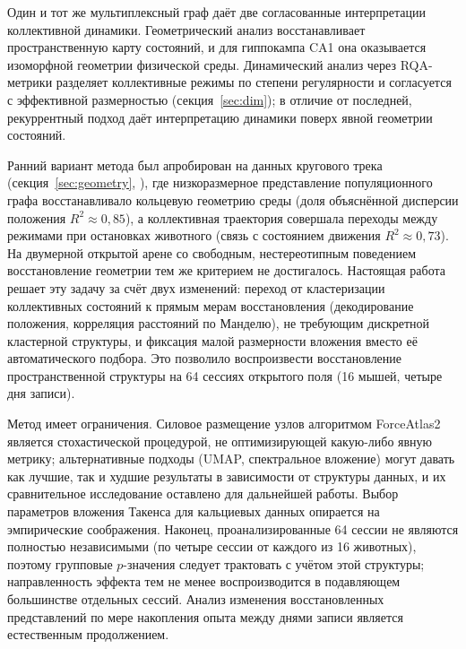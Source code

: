 Один и тот же мультиплексный граф даёт две согласованные интерпретации коллективной динамики. Геометрический анализ восстанавливает пространственную карту состояний, и для гиппокампа CA1 она оказывается изоморфной геометрии физической среды. Динамический анализ через RQA-метрики разделяет коллективные режимы по степени регулярности и согласуется с эффективной размерностью (секция~\ref{sec:dim}); в отличие от последней, рекуррентный подход даёт интерпретацию динамики поверх явной геометрии состояний.

Ранний вариант метода был апробирован на данных кругового трека (секция~\ref{sec:geometry}, \cite{Sotskov2022}), где низкоразмерное представление популяционного графа восстанавливало кольцевую геометрию среды (доля объяснённой дисперсии положения $R^2 \approx 0{,}85$), а коллективная траектория совершала переходы между режимами при остановках животного (связь с состоянием движения $R^2 \approx 0{,}73$). На двумерной открытой арене со свободным, нестереотипным поведением восстановление геометрии тем же критерием не достигалось. Настоящая работа решает эту задачу за счёт двух изменений: переход от кластеризации коллективных состояний к прямым мерам восстановления (декодирование положения, корреляция расстояний по Манделю), не требующим дискретной кластерной структуры, и фиксация малой размерности вложения вместо её автоматического подбора. Это позволило воспроизвести восстановление пространственной структуры на 64 сессиях открытого поля (16 мышей, четыре дня записи).

Метод имеет ограничения. Силовое размещение узлов алгоритмом ForceAtlas2 является стохастической процедурой, не оптимизирующей какую-либо явную метрику; альтернативные подходы (UMAP, спектральное вложение) могут давать как лучшие, так и худшие результаты в зависимости от структуры данных, и их сравнительное исследование оставлено для дальнейшей работы. Выбор параметров вложения Такенса для кальциевых данных опирается на эмпирические соображения. Наконец, проанализированные 64 сессии не являются полностью независимыми (по четыре сессии от каждого из 16 животных), поэтому групповые $p$-значения следует трактовать с учётом этой структуры; направленность эффекта тем не менее воспроизводится в подавляющем большинстве отдельных сессий. Анализ изменения восстановленных представлений по мере накопления опыта между днями записи является естественным продолжением.
